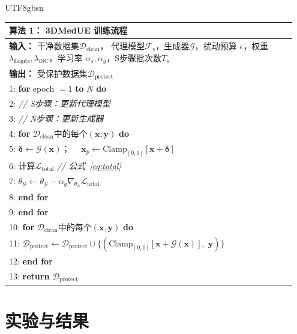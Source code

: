 \documentclass[a4paper,11pt]{article}
\begin{document}
\begin{CJK}{UTF8}{gbsn}
\begin{table}[t]
\centering
\small
\setlength{\tabcolsep}{3pt}
\begin{tabular}{p{0.95\linewidth}}
\toprule
\textbf{算法 1：} 3DMedUE 训练流程 \\
\midrule
\textbf{输入：} 干净数据集$\mathcal{D}_{\mathrm{clean}}$，
  代理模型$\mathcal{F}_s$，生成器$\mathcal{G}$，扰动预算
  $\epsilon$，权重$\lambda_{\text{Logits}},\lambda_{\text{ISC}}$，学习率
  $\alpha_s,\alpha_g$，S步骤批次数$T_s$ \\
\textbf{输出：} 受保护数据集$\mathcal{D}_{\mathrm{protect}}$ \\[2pt]
1: \textbf{for} epoch $= 1$ \textbf{to} $N$ \textbf{do} \\
2: \quad \textit{// S步骤：更新代理模型} \\
3: \quad \textit{// N步骤：更新生成器} \\
4: \quad \textbf{for} $\mathcal{D}_{\mathrm{clean}}$中的每个$(\bm{x},\bm{y})$ \textbf{do} \\
5: \quad\quad $\bm{\delta}\leftarrow\mathcal{G}(\bm{x})$；~~
  $\bm{x}_p\leftarrow\mathrm{Clamp}_{[0,1]}[\bm{x}+\bm{\delta}]$ \\
6: \quad\quad 计算$\mathcal{L}_{\mathrm{total}}$
  \hfill \textit{// 公式~\eqref{eq:total}} \\
7: \quad\quad $\theta_{\mathcal{G}}\leftarrow
  \theta_{\mathcal{G}}-\alpha_g\nabla_{\theta_{\mathcal{G}}}
  \mathcal{L}_{\mathrm{total}}$ \\
8: \quad \textbf{end for} \\
9: \textbf{end for} \\
10: \textbf{for} $\mathcal{D}_{\mathrm{clean}}$中的每个$(\bm{x},\bm{y})$ \textbf{do} \\
11: \quad $\mathcal{D}_{\mathrm{protect}}\leftarrow
  \mathcal{D}_{\mathrm{protect}}\cup
  \{(\mathrm{Clamp}_{[0,1]}[\bm{x}+\mathcal{G}(\bm{x})],
  \;\bm{y})\}$ \\
12: \textbf{end for} \\
13: \textbf{return} $\mathcal{D}_{\mathrm{protect}}$ \\
\bottomrule
\end{tabular}
\label{alg:3DMedUE}
\end{table}

\section{实验与结果}


\end{CJK}
\end{document}
